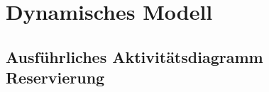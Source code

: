\chapter{Dynamisches Modell}

\section{Ausführliches Aktivitätsdiagramm Reservierung}

\begin{figure}[H]
	\centering
\end{figure}

